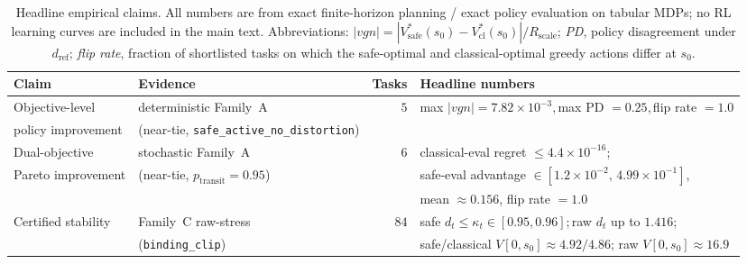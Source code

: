 \begin{table}[t]
\centering
\small
\caption{Headline empirical claims. All numbers are from exact
finite-horizon planning / exact policy evaluation on tabular MDPs;
no RL learning curves are included in the main text. Abbreviations:
$|vgn|=|V^*_{\mathrm{safe}}(s_0)-V^*_{\mathrm{cl}}(s_0)|/R_{\mathrm{scale}}$;
\emph{PD}, policy disagreement under $d_{\mathrm{ref}}$;
\emph{flip rate}, fraction of shortlisted tasks on which the
safe-optimal and classical-optimal greedy actions differ at $s_0$.}
\label{tab:phaseVI_summary}
\begin{tabular}{l l r l}
\toprule
Claim & Evidence & Tasks & Headline numbers \\
\midrule
Objective-level
  & deterministic Family~A & $5$
  & max $|vgn|=7.82\!\times\!10^{-3}$,\,max PD $=0.25$,\,flip rate $=1.0$ \\
policy improvement
  & (near-tie, \texttt{safe\_active\_no\_distortion}) & & \\
\addlinespace[3pt]
Dual-objective
  & stochastic Family~A & $6$
  & classical-eval regret $\le 4.4\!\times\!10^{-16}$; \\
Pareto improvement
  & (near-tie, $p_{\mathrm{transit}}=0.95$) & &
  safe-eval advantage $\in[1.2\!\times\!10^{-2},\,4.99\!\times\!10^{-1}]$, \\
  & & & mean $\approx 0.156$, flip rate $=1.0$ \\
\addlinespace[3pt]
Certified stability
  & Family~C raw-stress & $84$
  & safe $d_t\le\kappa_t\in[0.95,0.96]$;\,raw $d_t$ up to $1.416$; \\
  & (\texttt{binding\_clip}) & &
  safe/classical $V[0,s_0]\!\approx\!4.92/4.86$; raw $V[0,s_0]\!\approx\!16.9$ \\
\bottomrule
\end{tabular}
\end{table}
